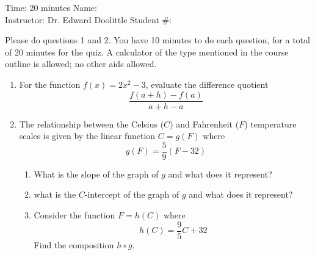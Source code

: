 \documentclass[12pt]{article}
\begin{document}
\thispagestyle{plain}

\begin{flushleft}
Time:  20 minutes                \hfill       Name: \underline{\hspace{2in}} \\
Instructor: Dr. Edward Doolittle \hfill Student \#: \underline{\hspace{2in}}
\end{flushleft}

\noindent
Please do questions 1 and 2.  You have 10 minutes
to do each question, for a total of 20
minutes for the quiz.  A 
calculator of the type mentioned in the course outline is allowed; no other
aids allowed.

\begin{enumerate}
\item For 
  the function $f(x)=2x^2-3$, evaluate the difference quotient
  \begin{equation*}
    \frac{f(a+h)-f(a)}{a+h-a}
  \end{equation*}
\vfill
\newpage
\item The 
  relationship between the Celsius ($C$) and Fahrenheit ($F$) temperature
  scales is given by the linear function $C=g(F)$ where 
  \begin{equation*}
    g(F) = \frac{5}{9}(F-32)
  \end{equation*}
  \begin{enumerate}
  \item What is the slope of the graph of $g$ and what does it represent?
  \item what is the $C$-intercept of the graph of $g$ and what does it 
    represent?
  \item Consider the function $F=h(C)$ where
    \begin{equation*}
      h(C) = \frac{9}{5}C + 32
    \end{equation*}
    Find the composition $h\circ g$.
  \end{enumerate}
\vfill
\end{enumerate}
\end{document}
